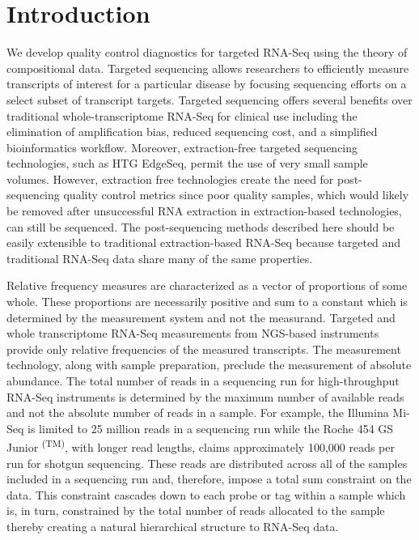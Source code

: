 \documentclass [10pt]{article}
\theoremstyle{definition}
\begin{document}
\newpage

\section{Introduction}


We develop quality control diagnostics for targeted RNA-Seq using the theory of compositional data.  Targeted sequencing allows researchers to efficiently measure transcripts of interest for a particular disease by focusing sequencing efforts on a select subset of transcript targets.  Targeted sequencing offers several benefits over traditional whole-transcriptome RNA-Seq for clinical use including the elimination of amplification bias, reduced sequencing cost, and a simplified bioinformatics workflow.  Moreover, extraction-free targeted sequencing technologies, such as HTG EdgeSeq, permit the use of very small sample volumes. However, extraction free technologies create the need for post-sequencing quality control metrics since poor quality samples, which would likely be removed after unsuccessful RNA extraction in extraction-based technologies, can still be sequenced.  The post-sequencing methods described here should be easily extensible to traditional extraction-based RNA-Seq because targeted and traditional RNA-Seq data share many of the same properties.


Relative frequency measures are characterized as a vector of proportions of some whole.  These proportions are necessarily positive and sum to a constant which is determined by the measurement system and not the measurand.  
Targeted and whole transcriptome RNA-Seq measurements from NGS-based instruments provide only relative frequencies of the measured transcripts.  The measurement technology, along with sample preparation, preclude the measurement of absolute abundance. The total number of reads in a sequencing run for high-throughput RNA-Seq instruments is determined by the maximum number of available reads  and not the absolute number of reads in a sample.  For example, the Illumina Mi-Seq is limited to 25 million reads in a sequencing run while the Roche 454 GS Junior \textsuperscript{(TM)}, with longer read lengths, claims approximately 100,000 reads per run for shotgun sequencing.  These reads are distributed across all of the samples included in a sequencing run and, therefore, impose a total sum constraint on the data.  This constraint cascades down to each probe or tag within a sample which is, in turn, constrained by the total number of reads allocated to the sample thereby creating a natural hierarchical structure to RNA-Seq data.
\end{document}
